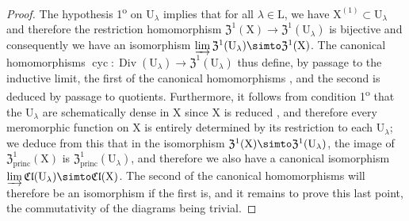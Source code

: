 \begin{proof}
The hypothesis 1\textsuperscript{o} on $\mathrm{U}_\lambda$ implies that for all $\lambda\in\mathrm{L}$, we have $\mathrm{X}^{(1)}\subset\mathrm{U}_\lambda$  and therefore the restriction homomorphism $\mathfrak{Z}^1(\mathrm{X})\to\mathfrak{Z}^1(\mathrm{U}_\lambda)$ is bijective and consequently we have an isomorphism $\varinjlim\mathfrak{Z}^1(\mathrm{U}_\lambda)\simto\mathfrak{Z}^1(\mathrm{X})$.
The canonical homomorphisms $\operatorname{cyc}:\operatorname{Div}(\mathrm{U}_\lambda)\to\mathfrak{Z}^1(\mathrm{U}_\lambda)$ thus define, by passage to the inductive limit, the first of the canonical homomorphisms , and the second is deduced by passage to quotients.
Furthermore, it follows from condition 1\textsuperscript{o} that the $\mathrm{U}_\lambda$ are schematically dense in $\mathrm{X}$ since $\mathrm{X}$ is reduced , and therefore every meromorphic function on $\mathrm{X}$ is entirely determined by its restriction to each $\mathrm{U}_\lambda$;
we deduce from this that in the isomorphism $\mathfrak{Z}^1(\mathrm{X})\simto\mathfrak{Z}^1(\mathrm{U}_\lambda)$, the image of $\mathfrak{Z}^1_\mathrm{princ}(\mathrm{X})$ is $\mathfrak{Z}^1_\mathrm{princ}(\mathrm{U}_\lambda)$, and therefore we also have a canonical isomorphism $\varinjlim\mathfrak{Cl}(\mathrm{U}_\lambda)\simto\mathfrak{Cl}(\mathrm{X})$.
The second of the canonical homomorphisms  will therefore be an isomorphism if the first is, and it remains to prove this last point, the commutativity of the diagrams  being trivial.


\end{proof}
